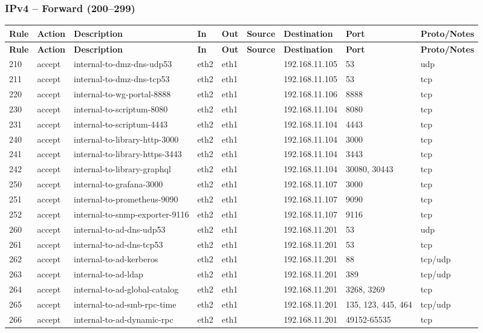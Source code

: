 \documentclass[a4paper,11pt]{article}
\begin{document}
\begin{landscape}
\subsubsection{IPv4 -- Forward (200--299)}
\begin{longtable}{|l|l|l|l|l|l|l|p{2.2cm}|l|}
\hline
\textbf{Rule} & \textbf{Action} & \textbf{Description} & \textbf{In} & \textbf{Out} & \textbf{Source} & \textbf{Destination} & \textbf{Port} & \textbf{Proto/Notes} \\
\hline
\endfirsthead
\hline
\textbf{Rule} & \textbf{Action} & \textbf{Description} & \textbf{In} & \textbf{Out} & \textbf{Source} & \textbf{Destination} & \textbf{Port} & \textbf{Proto/Notes} \\
\hline
\endhead
210 & accept & internal-to-dmz-dns-udp53 & eth2 & eth1 & & 192.168.11.105 & 53 & udp \\
211 & accept & internal-to-dmz-dns-tcp53 & eth2 & eth1 & & 192.168.11.105 & 53 & tcp \\
220 & accept & internal-to-wg-portal-8888 & eth2 & eth1 & & 192.168.11.106 & 8888 & tcp \\
230 & accept & internal-to-scriptum-8080 & eth2 & eth1 & & 192.168.11.104 & 8080 & tcp \\
231 & accept & internal-to-scriptum-4443 & eth2 & eth1 & & 192.168.11.104 & 4443 & tcp \\
240 & accept & internal-to-library-http-3000 & eth2 & eth1 & & 192.168.11.104 & 3000 & tcp \\
241 & accept & internal-to-library-https-3443 & eth2 & eth1 & & 192.168.11.104 & 3443 & tcp \\
242 & accept & internal-to-library-graphql & eth2 & eth1 & & 192.168.11.104 & 30080, 30443 & tcp \\
250 & accept & internal-to-grafana-3000 & eth2 & eth1 & & 192.168.11.107 & 3000 & tcp \\
251 & accept & internal-to-prometheus-9090 & eth2 & eth1 & & 192.168.11.107 & 9090 & tcp \\
252 & accept & internal-to-snmp-exporter-9116 & eth2 & eth1 & & 192.168.11.107 & 9116 & tcp \\
260 & accept & internal-to-ad-dns-udp53 & eth2 & eth1 & & 192.168.11.201 & 53 & udp \\
261 & accept & internal-to-ad-dns-tcp53 & eth2 & eth1 & & 192.168.11.201 & 53 & tcp \\
262 & accept & internal-to-ad-kerberos & eth2 & eth1 & & 192.168.11.201 & 88 & tcp/udp \\
263 & accept & internal-to-ad-ldap & eth2 & eth1 & & 192.168.11.201 & 389 & tcp/udp \\
264 & accept & internal-to-ad-global-catalog & eth2 & eth1 & & 192.168.11.201 & 3268, 3269 & tcp \\
265 & accept & internal-to-ad-smb-rpc-time & eth2 & eth1 & & 192.168.11.201 & 135, 123, 445, 464 & tcp/udp \\
266 & accept & internal-to-ad-dynamic-rpc & eth2 & eth1 & & 192.168.11.201 & 49152-65535 & tcp \\
\hline
\end{longtable}


\end{landscape}
\end{document}
